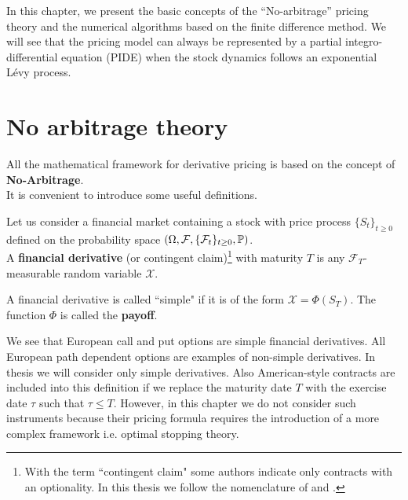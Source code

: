 In this chapter, we present the basic concepts of the ``No-arbitrage'' pricing theory and the numerical algorithms based on the finite difference method. 
We will see that the pricing model can always be represented by a partial integro-differential equation 
(PIDE) when the stock dynamics follows an exponential Lévy process. 


\section{No arbitrage theory}\label{No_arbitrage_theory}

All the mathematical framework for derivative pricing is based on the concept of \textbf{No-Arbitrage}.\\
It is convenient to introduce some useful definitions.
\begin{Definition}
 Let us consider a financial market containing a stock with price process $\{S_t\}_{t\geq0}$ defined on the probability space 
 $(\Omega,\mathcal{F},\{\mathcal{F}_{t}\}_{t\geq0},\mathbb{P})$. \\
 A \textbf{financial derivative} (or contingent claim)\footnote{ 
 With the term ``contingent claim" some authors indicate only contracts with an optionality. In this thesis we follow the nomenclature of \cite{Bjork} and \cite{Musiela}.} 
 with maturity $T$
 is any $\mathcal{F}_{T}$-measurable random variable $\mathcal{X}$.
 
 A financial derivative is called ``simple" if it is of the form $\mathcal{X} = \Phi(S_{T})$. The function $\Phi$ is called the \textbf{payoff}.  
\end{Definition}
We see that European call and put options are simple financial derivatives. 
All European path dependent options are examples of non-simple derivatives. In thesis we will consider only simple derivatives. 
Also American-style contracts are included into this definition if we replace 
the maturity date $T$ with the exercise date $\tau$ such that $\tau \leq T$. 
However, in this chapter we do not consider such instruments because their pricing formula requires the introduction of a more complex framework i.e.
optimal stopping theory.

